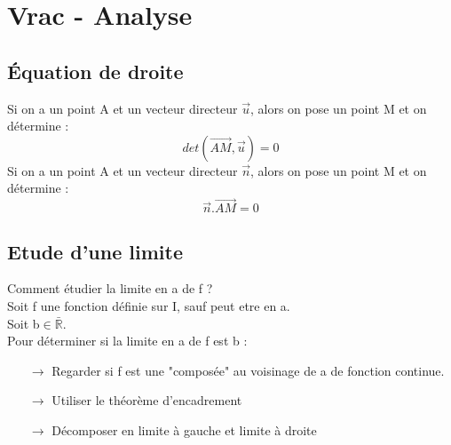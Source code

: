 \chapter{Vrac - Analyse}
\section{Équation de droite}
Si on a un point A et un vecteur directeur $\overrightarrow{u}$, alors on pose un point M et on détermine :
$$det(\overrightarrow{AM},\overrightarrow{u}) = 0$$
Si on a un point A et un vecteur directeur $\overrightarrow{n}$, alors on pose un point M et on détermine :
$$\overrightarrow{n}.\overrightarrow{AM}=0$$ 
\section{Etude d'une limite}
Comment étudier la limite en a de f ?\\
Soit f une fonction définie sur I, sauf peut etre en a.\\
Soit b$\in \bar{\mathbb{R}}$.\\
Pour déterminer si la limite en a de f est b : 
\begin{itemize}
 \item[$\rightarrow$] Regarder si f est une "composée" au voisinage de a de fonction continue.
 \item[$\rightarrow$] Utiliser le théorème d'encadrement
 \item[$\rightarrow$] Décomposer en limite à gauche et limite à droite
\end{itemize}

